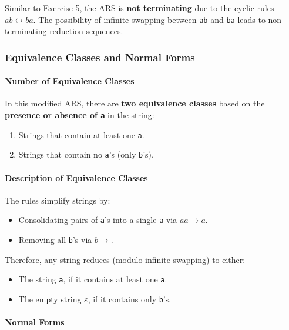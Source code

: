 \documentclass{article}
\begin{document}
Similar to Exercise 5, the ARS is \textbf{not terminating} due to the cyclic rules $ab \leftrightarrow ba$. The possibility of infinite swapping between \texttt{ab} and \texttt{ba} leads to non-terminating reduction sequences.

\subsubsection*{Equivalence Classes and Normal Forms}

\paragraph{Number of Equivalence Classes}

In this modified ARS, there are \textbf{two equivalence classes} based on the \textbf{presence or absence of \texttt{a}} in the string:

\begin{enumerate}
    \item Strings that contain at least one \texttt{a}.
    \item Strings that contain no \texttt{a}'s (only \texttt{b}'s).
\end{enumerate}

\paragraph{Description of Equivalence Classes}

The rules simplify strings by:

\begin{itemize}
    \item Consolidating pairs of \texttt{a}'s into a single \texttt{a} via $aa \to a$.
    \item Removing all \texttt{b}'s via $b \to$.
\end{itemize}

Therefore, any string reduces (modulo infinite swapping) to either:

\begin{itemize}
    \item The string \texttt{a}, if it contains at least one \texttt{a}.
    \item The empty string $\varepsilon$, if it contains only \texttt{b}'s.
\end{itemize}

\paragraph{Normal Forms}
\end{document}
